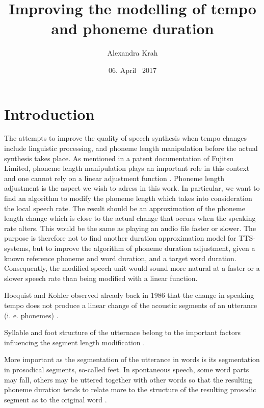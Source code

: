 \documentclass[a4paper]{scrreprt}
\begin{document}
\title{Improving the modelling of tempo and phoneme duration}
\author{Alexandra Krah}
\date{06. April ~2017}
\maketitle
\chapter*{}
\tableofcontents
\listoffigures

\chapter{Introduction}
The attempts to improve the quality of speech synthesis when tempo changes include linguistic processing, and phoneme length manipulation before the actual synthesis takes place. As mentioned in a patent documentation of Fujitsu Limited, phoneme length manipulation plays an important role in this context and one cannot rely on a linear adjustment function \cite{nishiike2008}. Phoneme length adjustment is the aspect we wish to adress in this work. In particular, we want to find an algorithm to modify the phoneme length which takes into consideration the local speech rate. The result should be an approximation of the phoneme length change which is close to the actual change that occurs when the speaking rate alters. This would be the same as playing an audio file faster or slower. The purpose is therefore not to find another duration approximation model for TTS-systems, but to improve the algorithm of phoneme duration adjustment, given a known reference phoneme and word duration, and a target word duration. Consequently, the modified speech unit would sound more natural at a faster or a slower speech rate than being modified with a linear function. 

Hoequist and Kohler observed already back in 1986 that the change in speaking tempo does not produce a linear change of the acoustic segments of an utterance (i. e. phonemes) \cite{Hoequist1986}. 

Syllable and foot structure of the utternace belong to the important factors influencing the segment length modification  \cite{Hoequist1986}.

More important as the segmentation of the utterance in words is its segmentation in prosodical segments, so-called feet. In spontaneous speech, some word parts may fall, others may be uttered together with other words so that the resulting phoneme duration tends to relate more to the structure of the resulting prosodic segment as to the original word \cite{Kohler1986}. 
\end{document}
